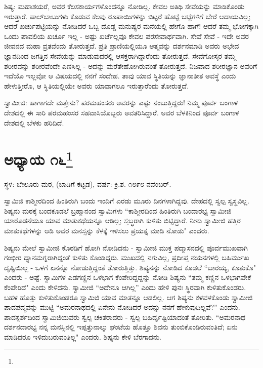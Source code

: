 ಶಿಷ್ಯ: ಮಹಾಶಯರೆ, ಅವರ ಕೆಲಸಕಾರ್ಯಗಳೊಂದನ್ನೂ ನೋಡಿಲ್ಲ. ಕೇವಲ ಅತಿಥಿ ಸೇವೆಯನ್ನು ಮಾಡಿಕೊಂಡು ಇರುತ್ತಾರೆ. ಪಾಲ್‌ಬಾಬುಗಳು ಕೊಡುವ ಕೆಲವು ರೂಪಾಯಿಗಳನ್ನು ಬಿಟ್ಟರೆ ಹೊಟ್ಟೆ ಬಟ್ಟೆಗಳಿಗೆ ಬೇರೆ ಆದಾಯವಿಲ್ಲ; ಆದರೆ ಖರ್ಚುಪಟ್ಟಿಯನ್ನು ನೋಡಿದರೆ ಒಬ್ಬ ದೊಡ್ಡ ಮನುಷ್ಯರ ಮನೆಯಲ್ಲಿ ಹೇಗೊ ಹಾಗೆ! ಆದರೆ ತಮ್ಮ ಭೋಗಕ್ಕಾಗಿ ಒಂದು ಪಾವಲಿಯ ಖರ್ಚೂ ಇಲ್ಲ - ಅಷ್ಟು ಖರ್ಚೆಲ್ಲವೂ ಕೇವಲ ಪರಸೇವಾರ್ಥವಾಗಿ. ಸೇವೆ ಸೇವೆ - ಇದೇ ಅವರ ಜೀವನದ ಮಹಾ ವ್ರತವೆಂದು ತೋರುತ್ತದೆ. ಪ್ರತಿ ಪ್ರಾಣಿಯಲ್ಲಿಯೂ ಆತ್ಮವನ್ನು ದರ್ಶನಮಾಡಿ ಅವರು ಅಭೇದ ಜ್ಞಾನದಿಂದ ಜಗತ್ತಿನ ಸೇವೆಯನ್ನು ಮಾಡುವುದರಲ್ಲಿ ಆಸಕ್ತರಾಗಿದ್ದಾರೆಂದು ತೋರುತ್ತದೆ. ಸೇವೆಗೋಸ್ಕರ ತಮ್ಮ ಶರೀರವನ್ನು ಶರೀರವೆಂದೇ ಎಣಿಸಿಲ್ಲ - ಅದನ್ನು ಮರೆತೇಹೋಗಿರುವಂತೆ ತೋರುತ್ತದೆ. ನಿಜವಾದ ಶರೀರಜ್ಞಾನ ಅವರಿಗೆ ಇದೆಯೊ ಇಲ್ಲವೋ ಆ ವಿಷಯದಲ್ಲಿ ನನಗೆ ಸಂದೇಹ. ತಾವು ಯಾವ ಸ್ಥಿತಿಯನ್ನು ಜ್ಞಾನಾತೀತ ಅವಸ್ಥೆ ಎಂದು ಹೇಳುತ್ತೀರೊ, ಆ ಸ್ಥಿತಿಯಲ್ಲಿಯೇ ಅವರು ಯಾವಾಗಲೂ ಇರುತ್ತಾರೆಂದು ತೋರುತ್ತದೆ.

ಸ್ವಾಮೀಜಿ: ಹಾಗಾಗದೇ ಮತ್ತೇನು? ಪರಮಹಂಸರು ಅವರನ್ನು ಎಷ್ಟು ನಂಬುತ್ತಿದ್ದರು! ನಿಮ್ಮ ಪೂರ್ವ ಬಂಗಾಳ ದೇಶದಲ್ಲಿ ಈ ಸಾರಿ ಪರಮಹಂಸರ ಸಹವಾಸಿಯೊಬ್ಬರು ಅವತರಿಸಿದ್ದಾರೆ. ಅವರ ಬೆಳಕಿನಿಂದ ಪೂರ್ವ ಬಂಗಾಳ ದೇಶದಲ್ಲಿ ಬೆಳಕು ಹರಿದಿದೆ.

\chapter[ಅಧ್ಯಾಯ ೧೬]{ಅಧ್ಯಾಯ ೧೬\protect\footnote{}}

\begin{center}
ಸ್ಥಳ: ಬೇಲೂರು ಮಠ, (ಬಾಡಿಗೆ ಕಟ್ಟಡ), ವರ್ಷ: ಕ್ರಿ.ಶ. ೧೮೯೮ ನವೆಂಬರ್.
\end{center}

ಸ್ವಾಮಿಜಿ ಕಾಶ್ಮೀರದಿಂದ ಹಿಂತಿರುಗಿ ಬಂದು ಇಂದಿಗೆ ಎರಡು ಮೂರು ದಿನಗಳಾಗಿದ್ದವು. ದೇಹದಲ್ಲಿ ಸ್ವಲ್ಪ ಸ್ವಸ್ಥವಿಲ್ಲ. ಶಿಷ್ಯನು ಮಠಕ್ಕೆ ಬಂದಕೂಡಲೆ ಬ್ರಹ್ಮಾನಂದ ಸ್ವಾಮಿಗಳು “ಕಾಶ್ಮೀರದಿಂದ ಹಿಂತಿರುಗಿ ಬಂದಾರಭ್ಯ ಸ್ವಾಮೀಜಿ ಯಾರೊಡನೆಯೂ ಯಾವ ಮಾತುಕಥೆಯನ್ನೂ ಆಡಿಲ್ಲ; ಸ್ತಬ್ಧರಾಗಿ ಕುಳಿತು ಬಿಟ್ಟಿದ್ದಾರೆ. ನೀನು ಸ್ವಾಮೀಜಿ ಹತ್ತಿರ ಮಾತುಕಥೆಗಳನ್ನು ಆಡಿ ಅವರ ಮನಸ್ಸನ್ನು ಕೆಳಕ್ಕೆ ಇಳಿಸಲು ಪ್ರಯತ್ನ ಮಾಡಿ ನೋಡು" ಎಂದರು.

ಶಿಷ್ಯನು ಮೇಲೆ ಸ್ವಾಮೀಜಿ ಕೊಠಡಿಗೆ ಹೋಗಿ ನೋಡಿದನು - ಸ್ವಾಮೀಜಿ ಮುಕ್ತ ಪದ್ಮಾಸನದಲ್ಲಿ ಪೂರ್ವಮುಖವಾಗಿ ಗಂಭೀರ ಧ್ಯಾನಮಗ್ನರಾಗಿದ್ದಂತೆ ಕುಳಿತು ಕೊಂಡಿದ್ದರು. ಮುಖದಲ್ಲಿ ನಗುವಿಲ್ಲ, ಪ್ರದೀಪ್ತ ನಯನಗಳಲ್ಲಿ ಬಹಿರ್ಮುಖ ದೃಷ್ಟಿಯಿಲ್ಲ - ಒಳಗೆ ಏನನ್ನೊ ನೋಡುತ್ತಿದ್ದಂತೆ ತೋರುತ್ತಿತ್ತು. ಶಿಷ್ಯನನ್ನು ನೋಡಿದ ಕೂಡಲೆ “ಬಾರಯ್ಯ, ಕೂತುಕೊ" ಎಂದರು - ಅಷ್ಟೆ. ಸ್ವಾಮಿಗಳ ಎಡಗಣ್ಣಿನ ಒಳಭಾಗ ಕೆಂಪೇರಿದ್ದದ್ದನ್ನು ನೋಡಿ ಶಿಷ್ಯನು “ತಮ್ಮ ಕಣ್ಣಿನ ಒಳಭಾಗವೇಕೆ ಕೆಂಪೇರಿದೆ" ಎಂದು ಕೇಳಿದನು. ಸ್ವಾಮೀಜಿ “ಅದೇನೂ ಆಗಿಲ್ಲ” ಎಂದು ಹೇಳಿ ಪುನಃ ಸ್ಥಿರವಾಗಿ ಕುಳಿತುಕೊಂಡರು. ಬಹಳ ಹೊತ್ತು ಕುಳಿತುಕೊಂಡರೂ ಸ್ವಾಮಿಜಿ ಯಾವ ಮಾತನ್ನೂ ಆಡಲಿಲ್ಲ. ಆಗ ಶಿಷ್ಯನು ಕಳವಳಕೊಂಡು ಸ್ವಾಮೀಜಿ ಪಾದಪದ್ಮವನ್ನು ಮುಟ್ಟಿ “ಅಮರನಾಥದಲ್ಲಿ ಏನೇನು ನೋಡಿದರೆ ಅದನ್ನು ನನಗೆ ಹೇಳುವುದಿಲ್ಲವೆ?” ಎಂದನು. ಪಾದಸ್ಪರ್ಶದಿಂದ ಸ್ವಾಮಿಜಿಯವರು ಸ್ವಲ್ಪ ಚಕಿತರಾದರು - ಸ್ವಲ್ಪ ಬಹಿರ್ದೃಷ್ಟಿಯಾದಂತೆ ತೋರಿತು. “ಅಮರನಾಥ ದರ್ಶನದಾರಭ್ಯ ನನ್ನ ಮನಸ್ಸಿನಲ್ಲಿ ಇಪ್ಪತ್ತುನಾಲ್ಕು ಘಂಟೆಯ ಹೊತ್ತೂ ಶಿವನು ತುಂಬಿಕೊಂಡಿರುವಂತಿದೆ; ಏನು ಮಾಡಿದರೂ ಇಳಿದುಬರುವಂತಿಲ್ಲ" ಎಂದರು. ಶಿಷ್ಯನು ಕೇಳಿ ಬೆರಗಾದನು.

